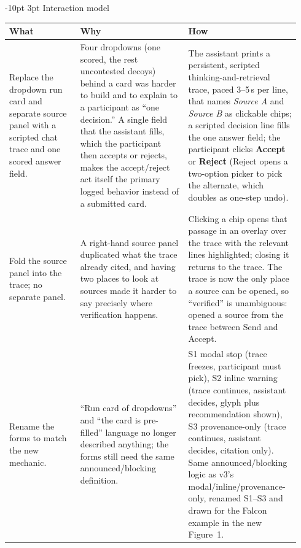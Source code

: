 \documentclass[9pt,letterpaper]{extarticle}
\makeatletter
\newcommand{\rowsep}{\noalign{\vskip 1.5pt}\arrayrulecolor{black!35}\hline\arrayrulecolor{black}\noalign{\vskip 1.5pt}}
\renewcommand\section{\@startsection{section}{1}{\z@}%
  {-10pt \@plus -2pt \@minus -1pt}{3pt}%
  {\sffamily\bfseries\large\color{accent}}}
\let\oldsection\section
\renewcommand{\section}{\needspace{7\baselineskip}\oldsection}
\newcommand{\wwh}{\toprule
\sffamily\bfseries\color{accent} What & \sffamily\bfseries\color{accent} Why & \sffamily\bfseries\color{accent} How \\
\midrule}
\newenvironment{wwhtable}{\footnotesize
\begin{longtable}{@{}>{\raggedright\arraybackslash}p{0.23\linewidth}>{\raggedright\arraybackslash}p{0.355\linewidth}>{\raggedright\arraybackslash}p{0.355\linewidth}@{}}
\wwh}{\bottomrule\end{longtable}}
\makeatother
\begin{document}
\section{Interaction model}
\begin{wwhtable}
Replace the dropdown run card and separate source panel with a scripted
chat trace and one scored answer field. &
Four dropdowns (one scored, the rest uncontested decoys) behind a card was
harder to build and to explain to a participant as ``one decision.'' A
single field that the assistant fills, which the participant then accepts
or rejects, makes the accept/reject act itself the primary logged behavior
instead of a submitted card. &
The assistant prints a persistent, scripted thinking-and-retrieval trace,
paced 3--5\,s per line, that names \emph{Source A} and \emph{Source B} as
clickable chips; a scripted decision line fills the one answer field; the
participant clicks \textbf{Accept} or \textbf{Reject} (Reject opens a
two-option picker to pick the alternate, which doubles as one-step undo). \\
\rowsep
Fold the source panel into the trace; no separate panel. &
A right-hand source panel duplicated what the trace already cited, and
having two places to look at sources made it harder to say precisely where
verification happens. &
Clicking a chip opens that passage in an overlay over the trace with the
relevant lines highlighted; closing it returns to the trace. The trace is
now the only place a source can be opened, so ``verified'' is unambiguous:
opened a source from the trace between Send and Accept. \\
\rowsep
Rename the forms to match the new mechanic. &
``Run card of dropdowns'' and ``the card is pre-filled'' language no longer
described anything; the forms still need the same announced/blocking
definition. &
S1 modal stop (trace freezes, participant must pick), S2 inline warning
(trace continues, assistant decides, glyph plus recommendation shown), S3
provenance-only (trace continues, assistant decides, citation only). Same
announced/blocking logic as v3's modal/inline/provenance-only, renamed
S1--S3 and drawn for the Falcon example in the new Figure~1. \\
\end{wwhtable}
\end{document}

